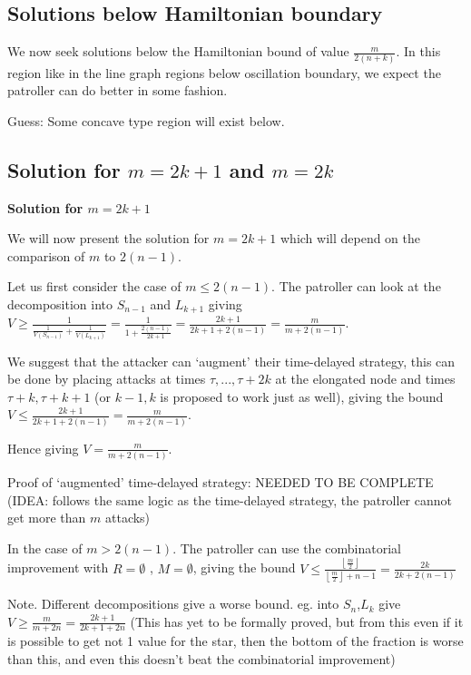 \documentclass[a4paper,10pt]{article}
\newcommand{\floor}[1]{\left \lfloor #1 \right \rfloor}
\theoremstyle{definition}
\theoremstyle{definition}
\theoremstyle{remark}
\theoremstyle{definition}
\begin{document}
\subsection{Solutions below Hamiltonian boundary}
We now seek solutions below the Hamiltonian bound of value $ \frac{m}{2(n+k)}$. In this region like in the line graph regions below oscillation boundary, we expect the patroller can do better in some fashion.

Guess: Some concave type region will exist below.


\subsection{Solution for $m=2k+1$ and $m=2k$}

\textbf{Solution for $m=2k+1$}

We will now present the solution for $m=2k+1$ which will depend on the comparison of $m$ to $2(n-1)$.

Let us first consider the case of $m \leq 2(n-1)$.
The patroller can look at the decomposition into $S_{n-1}$ and $L_{k+1}$ giving $V \geq \frac{1}{\frac{1}{V(S_{n-1})}+\frac{1}{V(L_{k+1})}}=\frac{1}{1+\frac{2(n-1)}{2k+1}}=\frac{2k+1}{2k+1+2(n-1)}=\frac{m}{m+2(n-1)}$.

We suggest that the attacker can `augment' their time-delayed strategy, this can be done by placing attacks at times $\tau,...,\tau+2k$ at the elongated node and times $\tau+k,\tau+k+1$ (or $k-1,k$ is proposed to work just as well), giving the bound $V \leq \frac{2k+1}{2k+1+2(n-1)}=\frac{m}{m+2(n-1)}$.

Hence giving $V=\frac{m}{m+2(n-1)}$.

Proof of `augmented' time-delayed strategy: NEEDED TO BE COMPLETE (IDEA: follows the same logic as the time-delayed strategy, the patroller cannot get more than $m$ attacks)

In the case of $m > 2(n-1)$.
The patroller can use the combinatorial improvement with $R=\emptyset$ , $M=\emptyset$, giving the bound $V \leq \frac{\floor{\frac{m}{2}}}{\floor{\frac{m}{2}}+n-1} = \frac{2k}{2k+2(n-1)}$

Note. Different decompositions give a worse bound. eg. into $S_{n}$,$L_{k}$ give $V \geq \frac{m}{m+2n}=\frac{2k+1}{2k+1+2n}$ (This has yet to be formally proved, but from this even if it is possible to get not 1 value for the star, then the bottom of the fraction is worse than this, and even this doesn't beat the combinatorial improvement)
\end{document}
